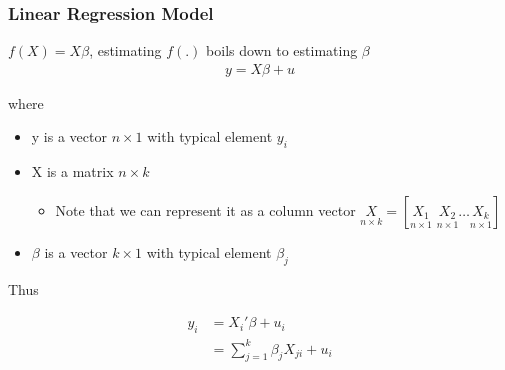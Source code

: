 \documentclass[
  shownotes,
  xcolor={svgnames},
  hyperref={colorlinks,citecolor=DarkBlue,linkcolor=DarkRed,urlcolor=DarkBlue}
  , aspectratio=169]{beamer}
\begin{document}
\begin{frame}
\frametitle{Linear Regression Model}
\bigskip
$f(X)=X\beta$, estimating $f(.)$ boils down to estimating $\beta$
\begin{align}
y = X \beta +u
\end{align}

where 
\begin{itemize}
  \item y is a vector $n \times 1$ with typical element $y_i$
  \item X is a matrix $n \times k$ 
  \begin{itemize}
    \tiny
      \item Note that we can represent it as a column vector $\underset{n\times k}{X}=[\underset{n\times 1}{X_1}\,\,\underset{n\times 1}{X_2}\dots \underset{n\times 1}{X_k}] $
  \end{itemize}
  \item $\beta$ is a vector $k \times 1$ with typical element $\beta_j$
\end{itemize}

\bigskip
Thus 

\begin{align}
y_i &= X_i' \beta +u_i  \\ \nonumber
    &= \sum_{j=1}^k \beta_j X_{ji} +u_i
\end{align}

\end{frame}
\end{document}

